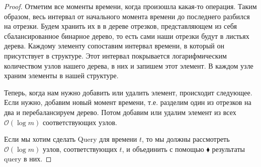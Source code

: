 \begin{proof}

Отметим все моменты времени, когда произошла какая-то операция.
Таким образом, весь интервал от начального момента времени до последнего разбился на отрезки.
Будем хранить их в в дереве отрезков, представляющем из себя сбалансированное бинарное дерево, то есть сами наши отрезки будут в листьях дерева.
Каждому элементу сопоставим интервал времени, в который он присутствует в структуре.
Этот интервал покрывается логарифмическим количеством узлов нашего дерева, в них и запишем этот элемент.
В каждом узле храним элементы в нашей структуре.

\vspace{10pt}

Теперь, когда нам нужно добавить или удалить элемент, происходит следующее.
Если нужно, добавим новый момент времени, т.е. разделим один из отрезков на два и перебалансируем дерево.
Потом добавим или удалим элемент из всех $\mathcal{O}(\log m)$ соответствующих узлов.

Если мы хотим сделать Query для времени $t$, то мы должны рассмотреть $\mathcal{O}(\log m)$ узлов, соответствующих $t$, и объединить с помощью $\blacklozenge$ результаты query в них.
\end{proof}

